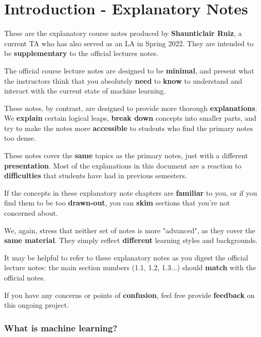 \chapter{Introduction - Explanatory Notes}
\label{intro}



These are the explanatory course notes produced by \textbf{Shaunticlair Ruiz}, a current TA who has also served as an LA in Spring 2022. They are intended to be \textbf{supplementary} to the official lectures notes.

The official course lecture notes are designed to be \textbf{minimal}, and present what the instructors think that you absolutely \textbf{need} to \textbf{know} to understand and interact with the current state of machine learning.

These notes, by contrast, are designed to provide more thorough \textbf{explanations}. We \textbf{explain} certain logical leaps, \textbf{break down} concepts into smaller parts, and try to make the notes more \textbf{accessible} to students who find the primary notes too dense.

These notes cover the \textbf{same} topics as the primary notes, just with a different \textbf{presentation}. Most of the explanations in this document are a reaction to \textbf{difficulties} that students have had in previous semesters.

If the concepts in these explanatory note chapters are \textbf{familiar} to you, or if you find them to be too \textbf{drawn-out}, you can \textbf{skim} sections that you're not concerned about. 

We, again, stress that neither set of notes is more "advanced", as they cover the \textbf{same material}. They simply reflect \textbf{different} learning styles and backgrounds. 

It may be helpful to refer to these explanatory notes as you digest the official lecture notes: the main section numbers (1.1, 1.2, 1.3...) should \textbf{match} with the official notes.

If you have any concerns or points of \textbf{confusion}, feel free provide \textbf{feedback} on this ongoing project.

\pagebreak



    \subsection{What is machine learning?} %
    
